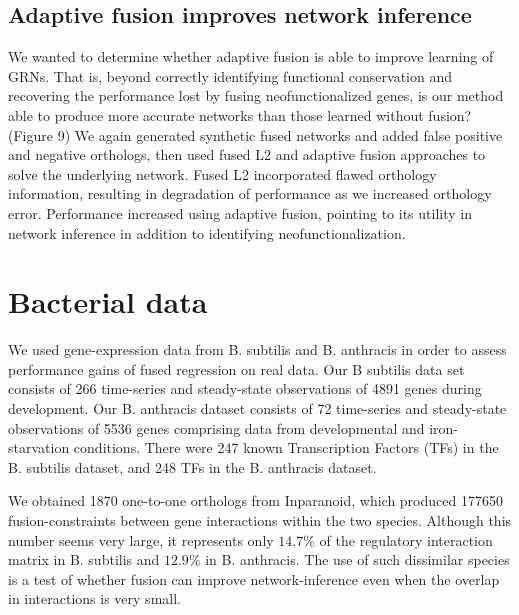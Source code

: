 \documentclass[11pt]{article}
\begin{document}
\subsection{Adaptive fusion improves network inference}
We wanted to determine whether adaptive fusion is able to improve learning of GRNs. That is, beyond correctly identifying functional conservation and recovering the performance lost by fusing neofunctionalized genes, is our method able to produce more accurate networks than those learned without fusion? (Figure 9) We again generated synthetic fused networks and added false positive and negative orthologs, then used fused L2 and adaptive fusion approaches to solve the underlying network. Fused L2 incorporated flawed orthology information, resulting in degradation of performance as we increased orthology error. Performance increased using adaptive fusion, pointing to its utility in network inference in addition to identifying neofunctionalization.


\section{Bacterial data}
We used gene-expression data from B. subtilis and B. anthracis in order to assess performance gains of fused regression on real data. Our B subtilis data set consists of 266 time-series and steady-state observations of 4891 genes during development. Our B. anthracis dataset consists of 72 time-series and steady-state observations of 5536 genes comprising data from developmental and iron-starvation conditions. There were 247 known Transcription Factors (TFs) in the B. subtilis dataset, and 248 TFs in the B. anthracis dataset. 

We obtained 1870 one-to-one orthologs from Inparanoid, which produced 177650 fusion-constraints between gene interactions within the two species. Although this number seems very large, it represents only $14.7\%$ of the regulatory interaction matrix in B. subtilis and $12.9\%$ in B. anthracis. The use of such dissimilar species is a test of whether fusion can improve network-inference even when the overlap in interactions is very small.
\end{document}
